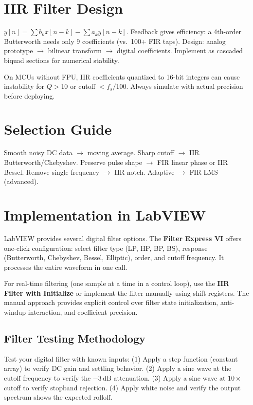 \documentclass[11pt,letterpaper,twoside,openany]{book}
\begin{document}
\section{IIR Filter Design}
$y[n] = \sum b_k x[n-k] - \sum a_k y[n-k]$. Feedback gives efficiency: a 4th-order Butterworth needs only 9 coefficients (vs.\ 100+ FIR taps). Design: analog prototype $\to$ bilinear transform $\to$ digital coefficients. Implement as cascaded biquad sections for numerical stability.

\begin{warningbox}
On MCUs without FPU, IIR coefficients quantized to 16-bit integers can cause instability for $Q > 10$ or cutoff $< f_s/100$. Always simulate with actual precision before deploying.
\end{warningbox}

\section{Selection Guide}
Smooth noisy DC data $\to$ moving average. Sharp cutoff $\to$ IIR Butterworth/Chebyshev. Preserve pulse shape $\to$ FIR linear phase or IIR Bessel. Remove single frequency $\to$ IIR notch. Adaptive $\to$ FIR LMS (advanced).


\section{Implementation in LabVIEW}
LabVIEW provides several digital filter options. The \textbf{Filter Express VI} offers one-click configuration: select filter type (LP, HP, BP, BS), response (Butterworth, Chebyshev, Bessel, Elliptic), order, and cutoff frequency. It processes the entire waveform in one call.

For real-time filtering (one sample at a time in a control loop), use the \textbf{IIR Filter with Initialize} or implement the filter manually using shift registers. The manual approach provides explicit control over filter state initialization, anti-windup interaction, and coefficient precision.

\subsection{Filter Testing Methodology}
Test your digital filter with known inputs: (1) Apply a step function (constant array) to verify DC gain and settling behavior. (2) Apply a sine wave at the cutoff frequency to verify the $-3$\,dB attenuation. (3) Apply a sine wave at $10\times$ cutoff to verify stopband rejection. (4) Apply white noise and verify the output spectrum shows the expected rolloff.
\end{document}
